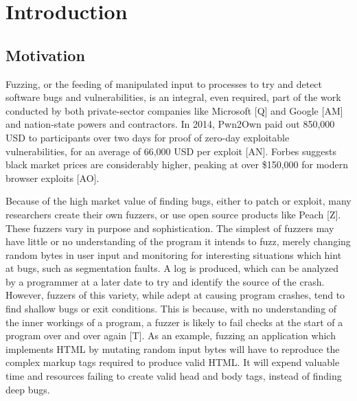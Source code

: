\documentclass[11pt,expanded,copyright]{fsuthesis}
\begin{document}
\chapter{Introduction}

\section{Motivation}

Fuzzing, or the feeding of manipulated input to processes to try and detect software bugs and vulnerabilities, is an integral, even required, part of the work conducted by both private-sector companies like Microsoft [Q] and Google [AM] and nation-state powers and contractors. In 2014, Pwn2Own paid out 850,000 USD to participants over two days for proof of zero-day exploitable vulnerabilities, for an average of 66,000 USD per exploit [AN]. Forbes suggests black market prices are considerably higher, peaking at over \$150,000 for modern browser exploits [AO].

Because of the high market value of finding bugs, either to patch or exploit, many researchers create their own fuzzers, or use open source products like Peach [Z]. These fuzzers vary in purpose and sophistication. The simplest of fuzzers may have little or no understanding of the program it intends to fuzz, merely changing random bytes in user input and monitoring for interesting situations which hint at bugs, such as segmentation faults. A log is produced, which can be analyzed by a programmer at a later date to try and identify the source of the crash. However, fuzzers of this variety, while adept at causing program crashes, tend to find shallow bugs or exit conditions. This is because, with no understanding of the inner workings of a program, a fuzzer is likely to fail checks at the start of a program over and over again [T]. As an example, fuzzing an application which implements HTML by mutating random input bytes will have to reproduce the complex markup tags required to produce valid HTML. It will expend valuable time and resources failing to create valid head and body tags, instead of finding deep bugs.
\end{document}
